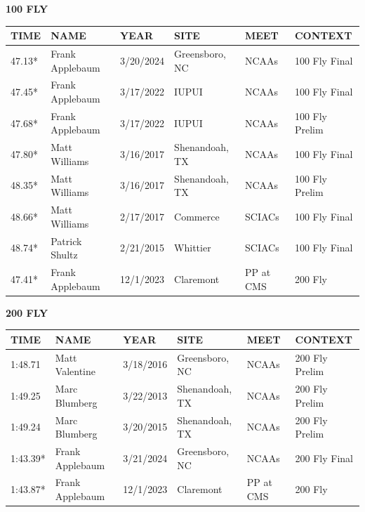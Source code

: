 \begin{table}[H]
\centering
\begin{minipage}[t]{0.48\textwidth}
\centering
\textbf{100 FLY}\\[0.1cm]
\begin{tabular}{@{}p{1.8cm}p{2.8cm}p{1.2cm}p{1.4cm}p{1.4cm}p{2.0cm}@{}}
\hline
    \textbf{TIME} & \textbf{NAME} & \textbf{YEAR} & \textbf{SITE} & \textbf{MEET} & \textbf{CONTEXT} \\
\hline
    47.13* & Frank Applebaum & 3/20/2024 & Greensboro, NC & NCAAs & 100 Fly Final \\
    47.45* & Frank Applebaum & 3/17/2022 & IUPUI & NCAAs & 100 Fly Final \\
    47.68* & Frank Applebaum & 3/17/2022 & IUPUI & NCAAs & 100 Fly Prelim \\
    47.80* & Matt Williams & 3/16/2017 & Shenandoah, TX & NCAAs & 100 Fly Final \\
    48.35* & Matt Williams & 3/16/2017 & Shenandoah, TX & NCAAs & 100 Fly Prelim \\
    48.66* & Matt Williams & 2/17/2017 & Commerce & SCIACs & 100 Fly Final \\
    48.74* & Patrick Shultz & 2/21/2015 & Whittier & SCIACs & 100 Fly Final \\
    47.41* & Frank Applebaum & 12/1/2023 & Claremont & PP at CMS & 200 Fly \\
\hline
\end{tabular}
\end{minipage}\hfill
\begin{minipage}[t]{0.48\textwidth}
\centering
\textbf{200 FLY}\\[0.1cm]
\begin{tabular}{@{}p{1.8cm}p{2.8cm}p{1.2cm}p{1.4cm}p{1.4cm}p{2.0cm}@{}}
\hline
    \textbf{TIME} & \textbf{NAME} & \textbf{YEAR} & \textbf{SITE} & \textbf{MEET} & \textbf{CONTEXT} \\
\hline
    1:48.71 & Matt Valentine & 3/18/2016 & Greensboro, NC & NCAAs & 200 Fly Prelim \\
    1:49.25 & Marc Blumberg & 3/22/2013 & Shenandoah, TX & NCAAs & 200 Fly Prelim \\
    1:49.24 & Marc Blumberg & 3/20/2015 & Shenandoah, TX & NCAAs & 200 Fly Prelim \\
    1:43.39* & Frank Applebaum & 3/21/2024 & Greensboro, NC & NCAAs & 200 Fly Final \\
    1:43.87* & Frank Applebaum & 12/1/2023 & Claremont & PP at CMS & 200 Fly \\

\end{tabular}
\end{minipage}
\end{table}
